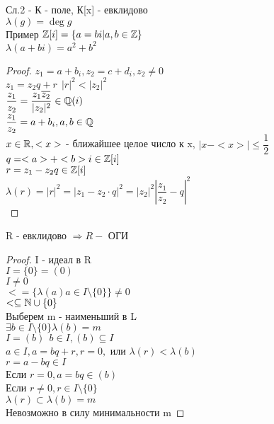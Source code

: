 Сл.2 - К - поле, К[x] - евклидово \\
$ \lambda(g) = \deg g $ \\
Пример $ \mathbb{Z}[i] = \{a = bi| a, b \in \mathbb{Z} \} $\\
$ \lambda(a + bi) = a^2 + b^2 $ \\
\begin{proof}
	$ z_1 = a + b_i, z_2 = c + d_i, z_2 \neq 0 $\\
	$ z_1 = z_2q + r \ \ |r|^2 < |z_2|^2 $ \\
	$ \dfrac{z_1}{z_2} = \dfrac{z_1 \overline{ z_2}}{|z_2|^2} \in \mathbb{Q}(i) $\\
	$ \dfrac{z_1}{z_2} = a + b_i, a, b \in \mathbb{Q} $ \\
	$ x \in \mathbb{R}, < x > $ - ближайшее целое число к x, $ | x - <x> | \leq \dfrac{1}{2} $ \\
	$ q = <a> + < b> i \in \mathbb{Z}[i] $ \\
	$ r = z_1 - z_2 q \in \mathbb{Z}[i] $ \\
	$ \lambda(r) = |r|^2 = |z_1 - z_2 \cdot q |^2 = |z_2|^2 \left| \dfrac{z_1}{z_2} - q \right|^2 $ \\
\end{proof}
\begin{theorem}
	R - евклидово $ \Rightarrow R - $ ОГИ \\
	\begin{proof}
		I - идеал в R \\
		$ I = \{0\} = (0) $ \\
		$ I \neq 0 $ \\
		$ < = \{ \lambda(a) a \in I \setminus \{0\} \} \neq 0 $ \\
		$ < \subseteq \mathbb{N} \cup \{0\} $ \\
		Выберем m - наименьший в L\\
		$ \exists b \in I \setminus \{0\} \lambda(b) = m $ \\
		$ I = (b)  \ \ b \in I, (b) \subseteq I $ \\
		$ a \in I, a = bq+r, r = 0, $ или $ \lambda (r) < \lambda (b) $ \\
		$ r = a - bq \in I $ \\
		Если $ r= 0, a = bq \in (b) $ \\
		Если $ r \neq 0, r \in I \setminus \{0\}$ \\
		$ \lambda(r) \subset \lambda(b) = m$ \\
		Невозможно в силу минимальности m 
	\end{proof}
\end{theorem}
